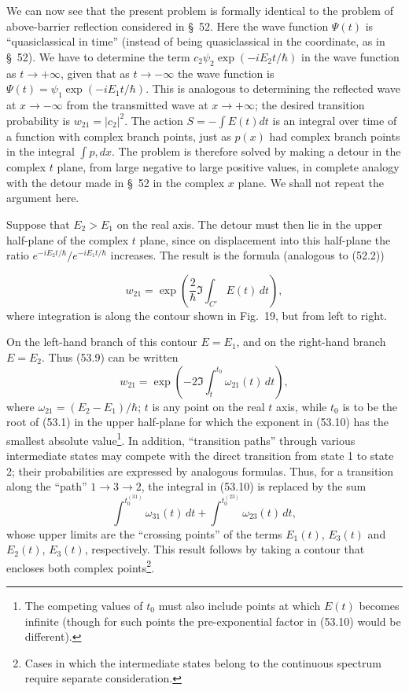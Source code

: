 We can now see that the present problem is formally identical to the problem of above-barrier reflection considered in §~52. Here the wave function $\Psi(t)$ is ``quasiclassical in time'' (instead of being quasiclassical in the coordinate, as in §~52). We have to determine the term $c_2\psi_2\exp(-iE_2t/\hbar)$ in the wave function as $t\to+\infty$, given that as $t\to-\infty$ the wave function is $\Psi(t)=\psi_1\exp(-iE_1t/\hbar)$. This is analogous to determining the reflected wave at $x\to-\infty$ from the transmitted wave at $x\to+\infty$; the desired transition probability is $w_{21}=|c_2|^2$. The action $S=-\int E(t)dt$ is an integral over time of a function with complex branch points, just as $p(x)$ had complex branch points in the integral $\int p,dx$. The problem is therefore solved by making a detour in the complex $t$ plane, from large negative to large positive values, in complete analogy with the detour made in §~52 in the complex $x$ plane. We shall not repeat the argument here.


Suppose that $E_2>E_1$ on the real axis.
The detour must then lie in the upper half-plane of the complex $t$ plane, since on displacement into this half-plane the ratio $e^{-iE_2t/\hbar}/e^{-iE_1t/\hbar}$ increases.
The result is the formula (analogous to (52.2))

\begin{equation}
 w_{21}=\exp\left(\frac2\hbar\Im\int_{C'}E(t)\,dt\right),
 \tag{53.9}
\end{equation}
where integration is along the contour shown in Fig.~19, but from left to right.

On the left-hand branch of this contour $E=E_1$, and on the right-hand branch $E=E_2$. Thus (53.9) can be written
\begin{equation}
 w_{21}=\exp\left(-2\Im\int_t^{t_0}\omega_{21}(t)\,dt\right),
 \tag{53.10}
\end{equation}
where $\omega_{21}=(E_2-E_1)/\hbar$; $t$ is any point on the real $t$ axis, while $t_0$ is to be the root of (53.1) in the upper half-plane for which the exponent in (53.10) has the smallest absolute value\footnote{The competing values of $t_0$ must also include points at which $E(t)$ becomes infinite (though for such points the pre-exponential factor in (53.10) would be different).}. In addition, ``transition paths'' through various intermediate states may compete with the direct transition from state 1 to state 2; their probabilities are expressed by analogous formulas. Thus, for a transition along the ``path'' $1\to3\to2$, the integral in (53.10) is replaced by the sum
\[
 \int^{t_0^{(31)}}\omega_{31}(t)\,dt+
 \int^{t_0^{(23)}}\omega_{23}(t)\,dt,
\]
whose upper limits are the ``crossing points'' of the terms $E_1(t)$, $E_3(t)$ and $E_2(t)$, $E_3(t)$, respectively. This result follows by taking a contour that encloses both complex points\footnote{Cases in which the intermediate states belong to the continuous spectrum require separate consideration.}.

